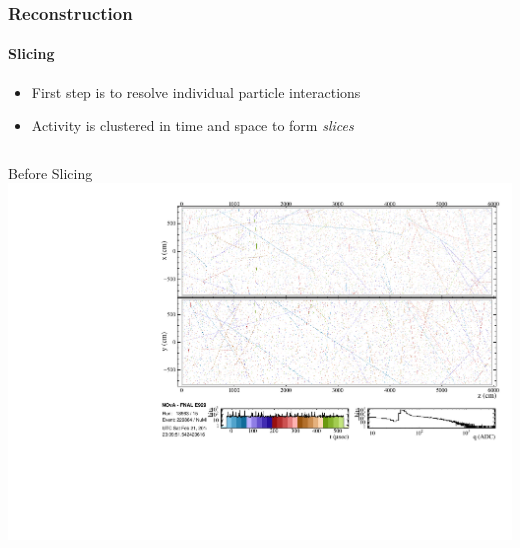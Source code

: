 \documentclass[10pt,professionalfonts,xcolor=table]{beamer}
\begin{document}
\begin{frame}

\frametitle{Reconstruction}
\framesubtitle{Slicing}

\begin{itemize}
\item First step is to resolve individual particle interactions
\gap
\item Activity is clustered in time and space to form \textit{slices}
\end{itemize}
\gap
\gap
\begin{columns}[b]
\centering
\textcolor{custom_red}{Before Slicing}
\includegraphics[height=\textwidth, angle=-90]{figures/evd_steps/evd_hits.pdf}


\end{columns}
\end{frame}
\end{document}
